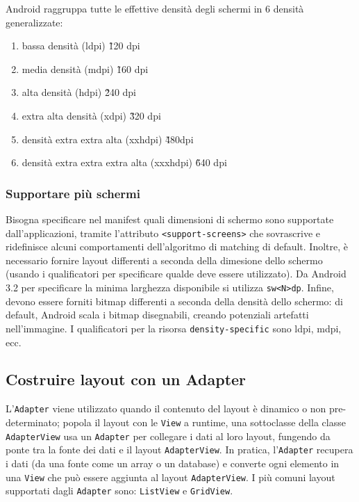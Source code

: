 Android raggruppa tutte le effettive densità degli schermi in 6 densità
generalizzate:

\begin{enumerate}
\item bassa densità (ldpi) \~ 120 dpi
\item media densità (mdpi) \~ 160 dpi
\item alta densità (hdpi) \~ 240 dpi
\item extra alta densità (xdpi) \~ 320 dpi
\item densità extra extra alta (xxhdpi) \~ 480dpi
\item densità extra extra extra alta (xxxhdpi) \~ 640 dpi
\end{enumerate}

\subsubsection{Supportare più schermi}

Bisogna specificare nel manifest quali dimensioni di schermo sono supportate
dall'applicazioni, tramite l'attributo \texttt{<support-screens>} che
sovrascrive e ridefinisce alcuni comportamenti dell'algoritmo di matching di
default.
Inoltre, è necessario fornire layout differenti a seconda della dimesione dello
schermo (usando i qualificatori per specificare qualde deve essere utilizzato).
Da Android 3.2 per specificare la minima larghezza disponibile si utilizza
\texttt{sw<N>dp}.
Infine, devono essere forniti bitmap differenti a seconda della densità dello
schermo: di default, Android scala i bitmap disegnabili, creando potenziali
artefatti nell'immagine. I qualificatori per la risorsa
\texttt{density-specific} sono ldpi, mdpi, ecc.

\subsection{Costruire layout con un Adapter}

L'\texttt{Adapter} viene utilizzato quando il contenuto del layout è dinamico o
non pre-determinato; popola il layout con le \texttt{View} a runtime, una
sottoclasse della classe \texttt{AdapterView} usa un \texttt{Adapter} per
collegare i dati al loro layout, fungendo da ponte tra la fonte dei dati e il
layout \texttt{AdapterView}. In pratica, l'\texttt{Adapter} recupera i dati (da
una fonte come un array o un database) e converte ogni elemento in una
\texttt{View} che può essere aggiunta al layout \texttt{AdapterView}.
I più comuni layout supportati dagli \texttt{Adapter} sono: \texttt{ListView} e
\texttt{GridView}.

